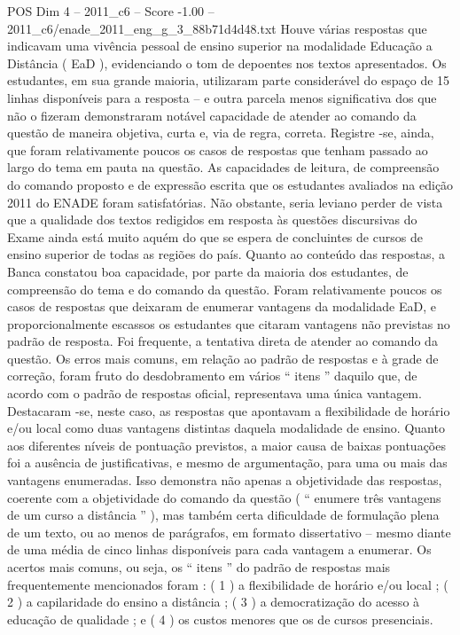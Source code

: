 \begin{textsample}{POS Dim 4 – 2011\_c6 – Score -1.00 – 2011\_c6/enade\_2011\_eng\_g\_3\_88b71d4d48.txt}
Houve várias respostas que indicavam uma vivência pessoal de ensino superior na modalidade Educação a Distância ( EaD ), evidenciando o tom de depoentes nos textos apresentados.
Os estudantes, em sua grande maioria, utilizaram parte considerável do espaço de 15 linhas disponíveis para a resposta – e outra parcela menos significativa dos que não o fizeram demonstraram notável capacidade de atender ao comando da questão de maneira objetiva, curta e, via de regra, correta.
Registre -se, ainda, que foram relativamente poucos os casos de respostas que tenham passado ao largo do tema em pauta na questão.
As capacidades de leitura, de compreensão do comando proposto e de expressão escrita que os estudantes avaliados na edição 2011 do ENADE foram satisfatórias.
Não obstante, seria leviano perder de vista que a qualidade dos textos redigidos em resposta às questões discursivas do Exame ainda está muito aquém do que se espera de concluintes de cursos de ensino superior de todas as regiões do país.
Quanto ao conteúdo das respostas, a Banca constatou boa capacidade, por parte da maioria dos estudantes, de compreensão do tema e do comando da questão.
Foram relativamente poucos os casos de respostas que deixaram de enumerar vantagens da modalidade EaD, e proporcionalmente escassos os estudantes que citaram vantagens não previstas no padrão de resposta.
Foi frequente, a tentativa direta de atender ao comando da questão.
Os erros mais comuns, em relação ao padrão de respostas e à grade de correção, foram fruto do desdobramento em vários “ itens ” daquilo que, de acordo com o padrão de respostas oficial, representava uma única vantagem.
Destacaram -se, neste caso, as respostas que apontavam a flexibilidade de horário e/ou local como duas vantagens distintas daquela modalidade de ensino.
Quanto aos diferentes níveis de pontuação previstos, a maior causa de baixas pontuações foi a ausência de justificativas, e mesmo de argumentação, para uma ou mais das vantagens enumeradas.
Isso demonstra não apenas a objetividade das respostas, coerente com a objetividade do comando da questão ( “ enumere três vantagens de um curso a distância ” ), mas também certa dificuldade de formulação plena de um texto, ou ao menos de parágrafos, em formato dissertativo – mesmo diante de uma média de cinco linhas disponíveis para cada vantagem a enumerar.
Os acertos mais comuns, ou seja, os “ itens ” do padrão de respostas mais frequentemente mencionados foram : ( 1 ) a flexibilidade de horário e/ou local ; ( 2 ) a capilaridade do ensino a distância ; ( 3 ) a democratização do acesso à educação de qualidade ; e ( 4 ) os custos menores que os de cursos presenciais.

\end{textsample}
